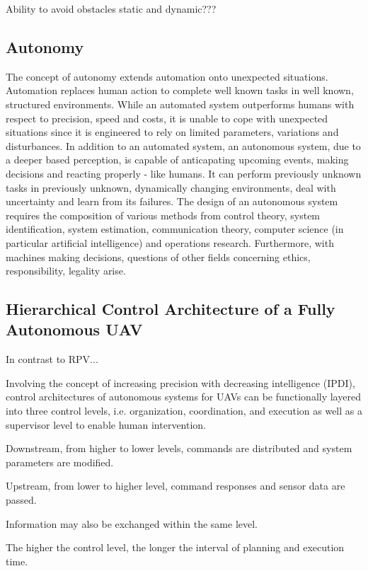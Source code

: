 Ability to avoid obstacles
static and dynamic???





\subsection{Autonomy}
The concept of autonomy extends
automation 
onto unexpected situations. 
Automation replaces human action
to complete well known tasks in well known, structured environments.
While an automated system outperforms humans
with respect to 
precision, speed and costs,
it is unable to
cope with unexpected situations
since it is engineered to rely on limited
parameters, variations and disturbances.
In addition to an automated system,
an autonomous system, 
due to a deeper based perception,
is capable of anticapating upcoming events,
making decisions and reacting properly - like humans.
It can perform previously unknown tasks
in previously unknown, dynamically changing environments,
deal with uncertainty and learn from its failures.
The design of an autonomous system
requires the composition of
various methods from 
control theory,
system identification, 
system estimation,
communication theory,
computer science (in particular artificial intelligence)
and
operations research.
Furthermore, with machines making decisions,
questions of other fields concerning
ethics,
responsibility,
legality
arise.


\subsection{Hierarchical Control Architecture of a Fully Autonomous UAV}

In contrast to RPV...

Involving the concept of 
increasing precision with decreasing intelligence (IPDI),
control architectures of autonomous systems for UAVs 
can be functionally layered
into three control levels, i.e.
organization, coordination, and execution
as well as a supervisor level
to enable human intervention.

Downstream, from higher to lower levels,
commands are distributed and
system parameters are modified.

Upstream, from lower to higher level,
command responses and sensor data
are passed.

Information may also be exchanged within the same level.

The higher the control level,
the longer the interval of planning and execution time.



